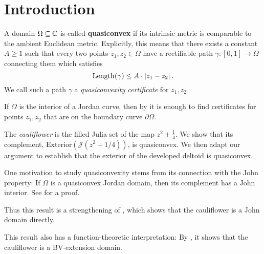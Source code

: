 


\section{Introduction}
A domain $\Omega\subseteq\mathbb{C}$ is called \textbf{quasiconvex }if its
intrinsic metric is comparable to the ambient Euclidean metric. Explicitly,
this means that there exists a constant $A\geq1$ such that every
two points $z_{1},z_{2}\in\Omega$ have a rectifiable path $\gamma:\left[0,1\right]\to\Omega$
connecting them which satisfies
\[
\operatorname{Length}(\gamma)\leq A\cdot\left|z_{1}-z_{2}\right|.
\]
We call such a path $\gamma$ a \emph{quasiconvexity certificate }for\emph{
$z_{1},z_{2}$.}

If $\Omega$ is the interior of a Jordan curve, then by \cite[Corollary F]{euclidean-quasiconvexity}
it is enough to find certificates for points $z_{1},z_{2}$ that are
on the boundary curve $\partial\Omega$.%
\begin{comment}
It is also shown in \cite{euclidean-quasiconvexity} that any quasidisk is quasiconvex.
\end{comment}

The \emph{cauliflower} is the filled Julia set of the map $z^2+\frac 14$.
We show that its complement, $\mathrm{Exterior}(\mathcal{J}(z^{2}+1/4))$,
is quasiconvex. We then adapt our argument to establish that the exterior of the developed deltoid is quasiconvex.



One motivation to study quasiconvexity stems from its connection with the
John property: If $\Omega$ is a quasiconvex Jordan domain, then its complement has a John interior. See \cite[Corollary 3.4]{euclidean-quasiconvexity} for a proof.

Thus this result is a strengthening of \cite[Theorem 6.1]{julia-and-john}, which shows that the cauliflower is a John domain directly.

This result also has a function-theoretic interpretation: By \cite[Theorem 1.1]{BV-extension}, it shows that the cauliflower is a BV-extension domain.

\begin{comment}
The Filled Julia set of $z^{2}+1/4$, called the cauliflower, has
an inward-pointing cusp and hence is not quasiconvex.
\end{comment}

